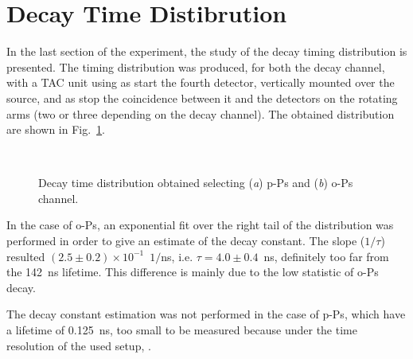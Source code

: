 \newpage 
\section*{Decay Time Distibrution}
In the last section of the experiment, the study of the decay timing distribution is presented.
The timing distribution was produced, for both the decay channel, with a TAC unit using as start the  fourth detector, vertically mounted over the source, and as stop the coincidence between it and the detectors on the rotating arms (two or three depending on the decay channel). 
The obtained distribution are shown in Fig.~\ref{Fig:DecayDist}.

\begin{figure}[H]
	\centering
	 \quad
		 \\
	\caption{Decay time distribution obtained selecting (\emph{a}) p-Ps and (\emph{b}) o-Ps channel. }
    \label{Fig:DecayDist}
\end{figure}

In the case of o-Ps, an exponential fit over the right tail of the distribution was performed in order to give an estimate of the decay constant. The slope ($1/\tau$) resulted $(2.5 \pm0.2)\times 10^{-1}$~$1/$ns, i.e. $\tau = 4.0\pm0.4$~ns, definitely too far from the 142~ns lifetime. This difference is mainly due to the low statistic of o-Ps decay.

The decay constant estimation was not performed in the case of p-Ps, which have a lifetime of  0.125~ns, too small to be measured because under the time resolution of the used setup, .
